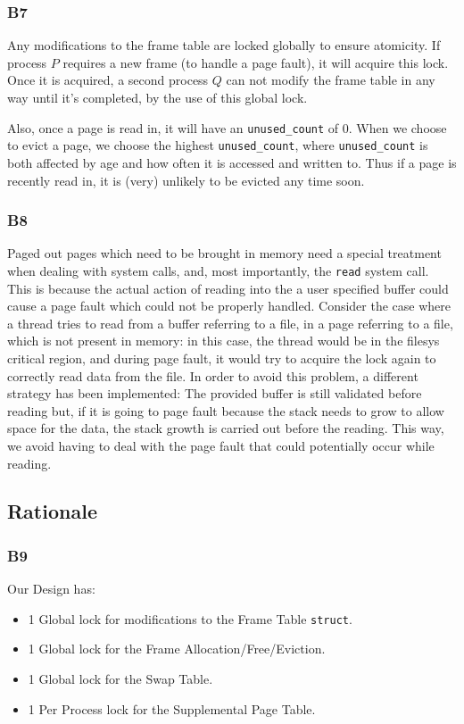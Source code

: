 \documentclass[a4wide, 11pt]{article}
\newcommand{\tx}{\texttt}
\begin{document}
\subsubsection{B7}

Any modifications to the frame table are locked globally to ensure atomicity. If process $P$ requires a new frame (to handle a page fault), it will acquire this lock. Once it is acquired, a second process $Q$ can not modify the frame table in any way until it's completed, by the use of this global lock.

Also, once a page is read in, it will have an \tx{unused\_count} of 0. When we choose to evict a page, we choose the highest \tx{unused\_count}, where \tx{unused\_count} is both affected by age and how often it is accessed and written to. Thus if a page is recently read in, it is (very) unlikely to be evicted any time soon.

\subsubsection{B8}
Paged out pages which need to be brought in memory need a special treatment when dealing with system calls, and, most importantly, the \tx{read} system call. This is because the actual action of reading into the a user specified buffer could cause a page fault which could not be properly handled. Consider the case where a thread tries to read from a buffer referring to a file, in a page referring to a file, which is not present in memory: in this case, the thread would be in the filesys critical region, and during page fault, it would try to acquire the lock again to correctly read data from the file. In order to avoid this problem, a different strategy has been implemented: The provided buffer is still validated before reading but, if it is going to page fault because the stack needs to grow to allow space for the data, the stack growth is carried out before the reading. This way, we avoid having to deal with the page fault that could potentially occur while reading.  

\subsection{Rationale}
\subsubsection{B9}

Our Design has:
\begin{itemize}
\item 1 Global lock for modifications to the Frame Table \tx{struct}.
\item 1 Global lock for the Frame Allocation/Free/Eviction.
\item 1 Global lock for the Swap Table.
\item 1 Per Process lock for the Supplemental Page Table.
\end{itemize}
\end{document}
